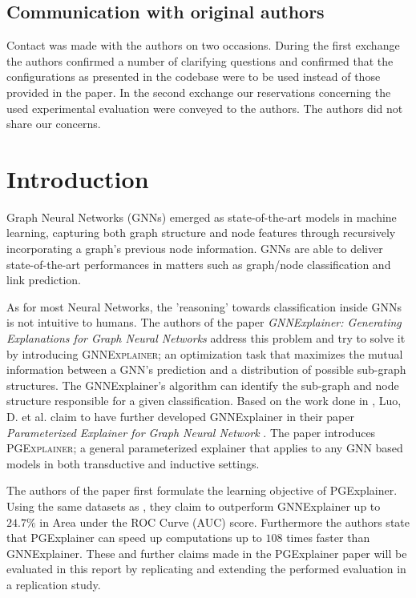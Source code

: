\subsection*{Communication with original authors}
Contact was made with the authors on two occasions. During the first exchange the authors confirmed a number of clarifying questions and confirmed that the configurations as presented in the codebase were to be used instead of those provided in the paper. In the second exchange our reservations concerning the used experimental evaluation were conveyed to the authors. The authors did not share our concerns. 

\newpage %
\section{Introduction}
Graph Neural Networks (GNNs) emerged as state-of-the-art models in machine learning, capturing both graph structure and node features through recursively incorporating a graph's previous node information. GNNs are able to deliver state-of-the-art performances in matters such as graph/node classification and link prediction.

As for most Neural Networks, the 'reasoning' towards classification inside GNNs is not intuitive to humans. The authors of the paper \textit{GNNExplainer: Generating Explanations for Graph Neural Networks} \cite{ying2019gnnexplainer} address this problem and try to solve it by introducing \textsc{GNNExplainer}; an optimization task that maximizes the mutual information between a GNN's prediction and a distribution of possible sub-graph structures. The GNNExplainer's algorithm can identify the sub-graph and node structure responsible for a given classification.
Based on the work done in \cite{ying2019gnnexplainer}, Luo, D. et al. claim to have further developed GNNExplainer in their paper \textit{Parameterized Explainer for Graph Neural Network} \cite{luo2020parameterized}. The paper introduces \textsc{PGExplainer}; a general parameterized explainer that applies to any GNN based models in both transductive and inductive settings. 

The authors of the paper first formulate the learning objective of PGExplainer. Using the same datasets as \cite{ying2019gnnexplainer}, they claim to outperform GNNExplainer up to $24.7\%$ in Area under the ROC Curve (AUC) \cite{Hanley1982roc-auc} score. Furthermore the authors state that PGExplainer can speed up computations up to $108$ times faster than GNNExplainer. These and further claims made in the PGExplainer paper will be evaluated in this report by replicating and extending the performed evaluation in a replication study.

